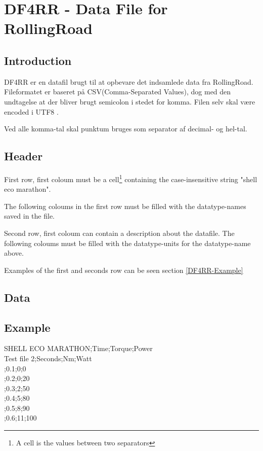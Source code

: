 \section{DF4RR - Data File for RollingRoad}

\subsection{Introduction}

 

DF4RR er en datafil brugt til at opbevare det indsamlede data fra RollingRoad. Fileformatet er baseret på CSV(Comma-Separated Values), dog med den undtagelse at der bliver brugt semicolon i stedet for komma.  Filen selv skal være encoded i UTF8 .

Ved alle komma-tal skal punktum bruges som separator af decimal- og hel-tal.

\subsection{Header}

First row, first coloum must be a cell\footnote{A cell is the values between two separators} containing the case-insensitive string "shell eco marathon".

The following coloums in the first row must be filled with the datatype-names saved in the file.

Second row, first coloum can contain a description about the datafile. The following coloums must be filled with the datatype-units for the datatype-name above. 

Examples of the first and seconds row can be seen section \vref{DF4RR-Example}

\subsection{Data}

\subsection{Example}
\label{DF4RR-Example}

SHELL ECO MARATHON;Time;Torque;Power\\
Test file 2;Seconds;Nm;Watt\\
;0.1;0;0\\
;0.2;0;20\\
;0.3;2;50\\
;0.4;5;80\\
;0.5;8;90\\
;0.6;11;100\\

